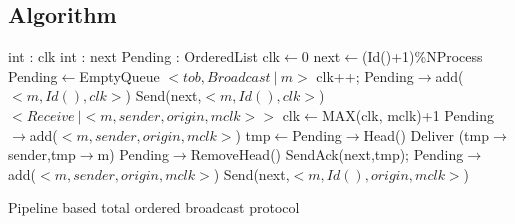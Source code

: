 \documentclass[a4paper]{article}
\begin{document}
\subsection{Algorithm}
\begin{algorithm}[H]
    \centering
    \begin{algorithmic}[5]
        \Data
        \State int : clk
        \State int : next
        \State Pending : OrderedList
        \EndData
        \Init
        \State clk$\gets$0
        \State next$\gets$(Id()+1)\%NProcess
        \State Pending$\gets$EmptyQueue
        \EndInit
        \Event $< tob,Broadcast\ |\ m> $
        \State clk++;
        \State Pending$\rightarrow$add($<m,Id(), clk>$) 
        \State Send(next,$<m,Id(),clk>$)
        \Else
        \EndIf
        \EndEvent
        \Event $<Receive\ | <m,sender, origin, mclk>>$
        \State clk$\gets$MAX(clk, mclk)+1
        \State Pending$\rightarrow$add($<m,sender,origin,mclk>$)
        \State tmp$\gets$Pending$\rightarrow$Head()
        \State Deliver (tmp$\rightarrow$sender,tmp$\rightarrow$m)
        \State Pending$\rightarrow$RemoveHead()
        \EndWhile
        \State SendAck(next,tmp);
        \EndIf
        \Else
        \State Pending$\rightarrow$add($<m,sender,origin,mclk>$)
        \State Send(next,$<m,Id(),origin,mclk>$)
        \EndIf
        \EndEvent
    \end{algorithmic}
    \caption{Pipeline based total ordered broadcast protocol}
\end{algorithm}
\end{document}
